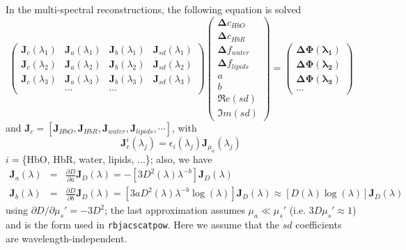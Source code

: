\documentclass[12pt]{book}               %
\begin{document}
In the multi-spectral reconstructions, the following equation is solved
\begin{equation}\label{eq:multispectral}
\left(
\begin{array}{llll}
\mathbf{J}_{c}(\lambda_1) & \mathbf{J}_{a}(\lambda_1) & \mathbf{J}_b(\lambda_1) & \mathbf{J}_{sd}(\lambda_1)\\
\mathbf{J}_{c}(\lambda_2) & \mathbf{J}_{a}(\lambda_2) & \mathbf{J}_b(\lambda_2) & \mathbf{J}_{sd}(\lambda_2)\\
\mathbf{J}_{c}(\lambda_3) & \mathbf{J}_{a}(\lambda_3) & \mathbf{J}_b(\lambda_3) & \mathbf{J}_{sd}(\lambda_3)\\
 & \cdots & \cdots 
\end{array}\right)
\left(
\begin{array}{c}
\boldsymbol{\Delta}{c_{HbO}}\\
\boldsymbol{\Delta}{c_{HbR}}\\
\boldsymbol{\Delta}{f_{water}}\\
\boldsymbol{\Delta}{f_{lipids}}\\
a\\
b\\
\Re e({sd})\\
\Im m({sd})
\end{array}
\right)=\left(
\begin{array}{c}
\boldsymbol{\Delta\Phi(\lambda_1)}\\
\boldsymbol{\Delta\Phi(\lambda_2)}\\
\boldsymbol{\Delta\Phi(\lambda_3)}\\
\cdots
\end{array}\right)
\end{equation}
and $\mathbf{J}_{c}=\left[\mathbf{J}_{HbO}, \mathbf{J}_{HbR}, \mathbf{J}_{water}, \mathbf{J}_{lipids}, \cdots\right]$, with
\begin{equation}
\mathbf{J}_{c}^i(\lambda_j)=\epsilon_i(\lambda_j)\mathbf{J}_{\mu_a}(\lambda_j)
\end{equation}
$i=$\{HbO, HbR, water, lipids, ...\}; also, we have
\begin{eqnarray}
\mathbf{J}_a(\lambda)&=&\frac{\partial D}{\partial a}\mathbf{J}_D(\lambda) = -\left[3D^2(\lambda)\lambda^{-b}\right]\mathbf{J}_D(\lambda)\\
\mathbf{J}_b(\lambda)&=&\frac{\partial D}{\partial b}\mathbf{J}_D(\lambda) = \left[3aD^2(\lambda)\lambda^{-b}\log(\lambda)\right]\mathbf{J}_D(\lambda)\approx\left[D(\lambda)\log(\lambda)\right]\mathbf{J}_D(\lambda)
\end{eqnarray}
using $\partial D/\partial\mu_s'=-3D^2$; the last approximation assumes $\mu_a\ll\mu_s'$ (i.e. $3D\mu_s'\approx1$)
and is the form used in \texttt{rbjacscatpow}. Here we assume that the $sd$ coefficients are wavelength-independent.
\end{document}
